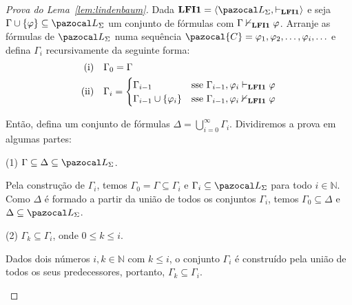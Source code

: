     \begin{proof}[Prova do Lema~\ref{lem:lindenbaum}]
        Dada $\lfium{} = \langle \ling, \conhil \rangle$ e seja $\Gamma \cup \{\phi\} \subseteq \ling$ um conjunto de fórmulas com $\Gamma \nvdash_{{\normalfont\textbf{LFI1}}{}} \varphi$. Arranje     as fórmulas de $\ling$ numa sequência $\pazocal{C} = \phi_1, \phi_2, \ldots, \phi_i, \ldots$ e defina $\Gamma_i$ recursivamente da seguinte forma:
        \begin{align*}
                \text{(i)}\quad&\Gamma_0 = \Gamma\\
                \text{(ii)}\quad&\Gamma_i =
                \begin{cases}
                    \Gamma_{i - 1} &\text{sse}~ \Gamma_{i - 1}, \varphi_i \vdash_{{\normalfont\textbf{LFI1}}{}} \varphi\\
                    \Gamma_{i - 1} \cup \{\varphi_i\} &\text{sse}~ \Gamma_{i - 1}, \varphi_i \nvdash_{{\normalfont\textbf{LFI1}}{}} \varphi
                \end{cases}
        \end{align*}

        Então, defina um conjunto de fórmulas $\Delta = \bigcup_{i=0}^{\infty}\Gamma_i$. Dividiremos a prova em algumas partes:
        
        \begin{adjustwidth}{1cm}{}
            \noindent(1) $\Gamma \subseteq \Delta \subseteq \ling$.

            \begin{adjustwidth}{1cm}{}
                Pela construção de $\Gamma_i$, temos $\Gamma_0 = \Gamma \subseteq \Gamma_i$ e $\Gamma_i \subseteq \ling$ para todo $i \in \mathbb{N}$. Como $\Delta$ é formado a partir da união de todos os conjuntos $\Gamma_i$, temos $\Gamma_0 \subseteq \Delta$ e $\Delta \subseteq \ling$.
            \end{adjustwidth}

            \noindent(2) $\Gamma_k \subseteq \Gamma_i$, onde $0 \leq k \leq i$.

            \begin{adjustwidth}{1cm}{}
                Dados dois números $i, k \in \mathbb{N}$ com $k \leq i$, o conjunto $\Gamma_i$ é construído pela união de todos os seus predecessores, portanto, $\Gamma_k \subseteq \Gamma_i$.
                

\end{adjustwidth}
\end{adjustwidth}
\end{proof}

